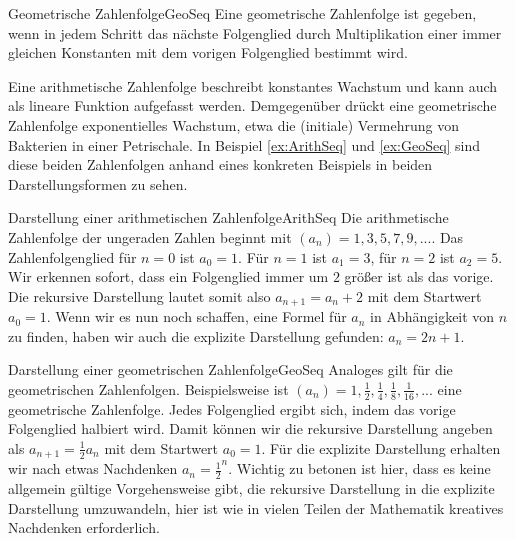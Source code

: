 \begin{definition}{Geometrische Zahlenfolge}{GeoSeq}
	Eine geometrische Zahlenfolge ist gegeben, wenn in jedem Schritt das nächste Folgenglied durch Multiplikation einer immer gleichen Konstanten mit dem vorigen Folgenglied bestimmt wird.
\end{definition}

Eine arithmetische Zahlenfolge beschreibt konstantes Wachstum und kann auch als lineare Funktion aufgefasst werden. Demgegenüber drückt eine geometrische Zahlenfolge exponentielles Wachstum, etwa die (initiale) Vermehrung von Bakterien in einer Petrischale. In Beispiel \ref{ex:ArithSeq} und \ref{ex:GeoSeq} sind diese beiden Zahlenfolgen anhand eines konkreten Beispiels in beiden Darstellungsformen zu sehen.

\begin{example}{Darstellung einer arithmetischen Zahlenfolge}{ArithSeq}
	Die arithmetische Zahlenfolge der ungeraden Zahlen beginnt mit $(a_n) = 1, 3, 5, 7, 9, ...$. Das Zahlenfolgenglied für $n=0$ ist $a_0=1$. Für $n=1$ ist $a_1=3$, für $n=2$ ist $a_2=5$. Wir erkennen sofort,
dass ein Folgenglied immer um $2$ größer ist als das vorige. Die rekursive Darstellung lautet somit also $a_{n+1} = a_n + 2$ mit dem Startwert $a_0 = 1$.  Wenn wir es nun noch schaffen, eine Formel für $a_n$ in Abhängigkeit von $n$ zu finden, haben wir auch die explizite Darstellung gefunden: $a_n = 2n+1$.
\end{example}

\begin{example}{Darstellung einer geometrischen Zahlenfolge}{GeoSeq}
	Analoges gilt für die geometrischen Zahlenfolgen. Beispielsweise ist $(a_n) = 1, \frac{1}{2}, \frac{1}{4}, \frac{1}{8}, \frac{1}{16}, ...$ eine geometrische Zahlenfolge. Jedes Folgenglied ergibt sich, indem das
vorige Folgenglied halbiert wird. Damit können wir die rekursive Darstellung angeben als $a_{n+1} = \frac{1}{2}a_n$ mit dem Startwert $a_0=1$. Für die explizite Darstellung erhalten wir nach etwas Nachdenken $a_n = {\frac{1}{2}}^n$. Wichtig zu betonen ist hier, dass es keine allgemein gültige Vorgehensweise gibt, die rekursive Darstellung in die explizite Darstellung umzuwandeln, hier ist wie in vielen Teilen der Mathematik kreatives Nachdenken erforderlich.
\end{example}

